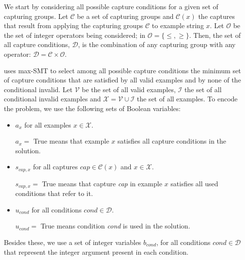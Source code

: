 We start by considering all possible capture conditions for a given set of capturing groups. Let \(\mathcal{C}\) be a set of capturing groups and \(\mathcal{C}(x)\) the captures that result from applying the capturing groups \(\mathcal{C}\) to example string \(x\). Let \(\mathcal{O}\) be the set of integer operators being considered; in \Forest \(\mathcal{O} = \{\le, \ge\}\). Then, the set of all capture conditions, \(\mathcal{D}\), is the combination of any capturing group with any operator: \(\mathcal{D} = \mathcal{C} \times \mathcal{O}\).


\Forest uses max-\ac{SMT} to select among all possible capture conditions the minimum set of capture conditions that are satisfied by all valid examples and by none of the conditional invalid.
%
Let \(\mathcal{V}\) be the set of all valid examples, \(\mathcal{I}\) the set of all conditional invalid examples and \(\mathcal{X} = \mathcal{V} \cup \mathcal{I}\) the set of all examples.
To encode the problem, we use the following sets of Boolean variables:
\begin{itemize}
    \item \(a_x\) for all examples \(x \in \mathcal{X}\).
    
    \(a_x = \) True means that example \(x\) satisfies all capture conditions in the solution.
    
    \item \(s_{\textit{cap}, x}\) for all captures \(\textit{cap} \in \mathcal{C}(x)\) and \(x \in \mathcal{X}\).
    
    \(s_{\textit{cap}, x} =\) True means that capture \textit{cap} in example \(x\) satisfies all used conditions that refer to it.

    
    \item \(u_{\textit{cond}}\) for all conditions \(\textit{cond} \in \mathcal{D}\). 
    
    \(u_{\textit{cond}} = \) True means condition \textit{cond} is used in the solution.
\end{itemize}

Besides these, we use a set of integer variables \(b_{\textit{cond}}\), for all conditions \(\textit{cond} \in \mathcal{D}\) that represent the integer argument present in each condition.


